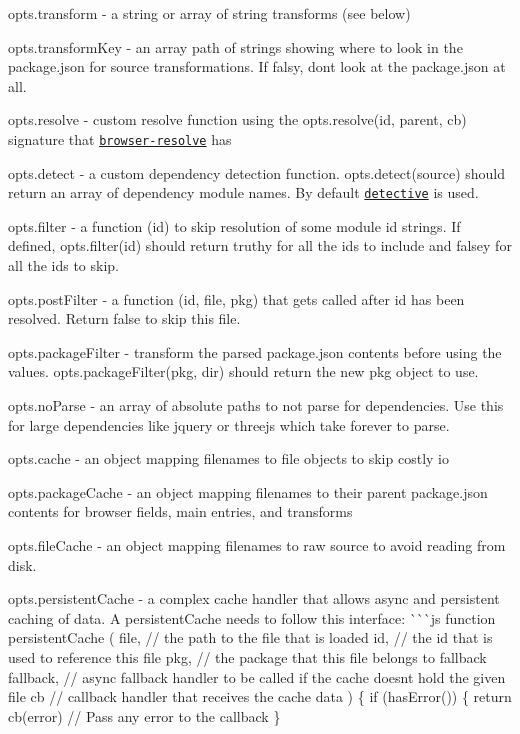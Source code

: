 \begin{DoxyItemize}
\item {\ttfamily opts.\+transform} -\/ a string or array of string transforms (see below)
\item {\ttfamily opts.\+transform\+Key} -\/ an array path of strings showing where to look in the package.\+json for source transformations. If falsy, don\textquotesingle{}t look at the package.\+json at all.
\item {\ttfamily opts.\+resolve} -\/ custom resolve function using the {\ttfamily opts.\+resolve(id, parent, cb)} signature that \href{https://github.com/shtylman/node-browser-resolve}{\tt browser-\/resolve} has
\item {\ttfamily opts.\+detect} -\/ a custom dependency detection function. {\ttfamily opts.\+detect(source)} should return an array of dependency module names. By default \href{https://github.com/browserify/detective}{\tt detective} is used.
\item {\ttfamily opts.\+filter} -\/ a function (id) to skip resolution of some module {\ttfamily id} strings. If defined, {\ttfamily opts.\+filter(id)} should return truthy for all the ids to include and falsey for all the ids to skip.
\item {\ttfamily opts.\+post\+Filter} -\/ a function (id, file, pkg) that gets called after {\ttfamily id} has been resolved. Return false to skip this file.
\item {\ttfamily opts.\+package\+Filter} -\/ transform the parsed package.\+json contents before using the values. {\ttfamily opts.\+package\+Filter(pkg, dir)} should return the new {\ttfamily pkg} object to use.
\item {\ttfamily opts.\+no\+Parse} -\/ an array of absolute paths to not parse for dependencies. Use this for large dependencies like jquery or threejs which take forever to parse.
\item {\ttfamily opts.\+cache} -\/ an object mapping filenames to file objects to skip costly io
\item {\ttfamily opts.\+package\+Cache} -\/ an object mapping filenames to their parent package.\+json contents for browser fields, main entries, and transforms
\item {\ttfamily opts.\+file\+Cache} -\/ an object mapping filenames to raw source to avoid reading from disk.
\item {\ttfamily opts.\+persistent\+Cache} -\/ a complex cache handler that allows async and persistent caching of data. A {\ttfamily persistent\+Cache} needs to follow this interface\+: \`{}\`{}\`{}js function persistent\+Cache ( file, // the path to the file that is loaded id, // the id that is used to reference this file pkg, // the package that this file belongs to fallback fallback, // async fallback handler to be called if the cache doesn\textquotesingle{}t hold the given file cb // callback handler that receives the cache data ) \{ if (has\+Error()) \{ return cb(error) // Pass any error to the callback \}


\end{DoxyItemize}
